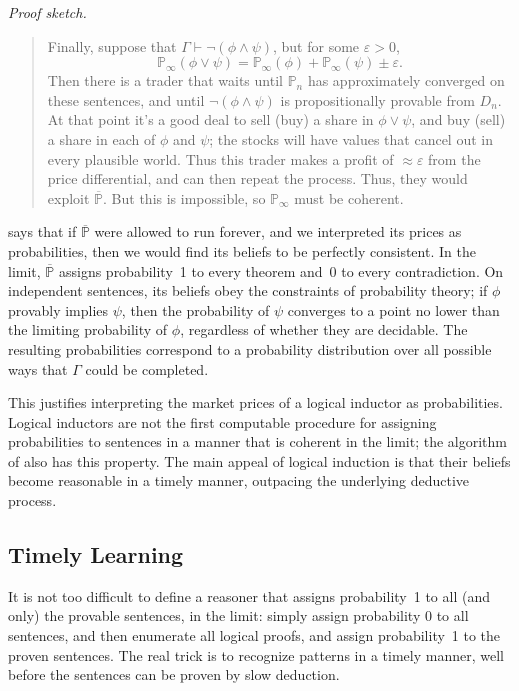 \documentclass[authordate,onecolumn,noenvironments]{miri-tech-article}
\numberwithin{equation}{subsection}
\newenvironment{sketch}[1][]{\noindent\emph{Proof sketch.}\proofin{#1}\begin{quote}}{\end{quote}}
\newcommand{\seq}[1]{{\overline{#1}}}
\newcommand{\nn}{n}
\newcommand{\li}{logical inductor}
\newcommand{\rparenthetical}[1]{\hfill\upshape{{\small (#1)}}} %
\newcommand{\proofin}[1]{\rparenthetical{Proof in:~#1.}}
\newcommand{\BelState}{\mathbb{P}}
\newcommand{\pt}{\BelState}
\newcommand{\MP}{\seq{\pt}}
\newcommand{\dt}{D}
\newcommand{\Theory}{\Gamma}
\begin{document}
\begin{sketch}[\ref{sec:limitcoherence} or~\ref{app:lc}]
  Finally, suppose that $\Theory \vdash \lnot(\phi \land \psi)$, but for some $\varepsilon > 0$,
  \[
    \pt_\infty(\phi \lor \psi) = \pt_\infty(\phi) + \pt_\infty(\psi) \pm \varepsilon.
  \] 
  Then there is a trader that waits until $\pt_n$ has approximately converged on these sentences, and until  $\lnot(\phi \land \psi)$ is propositionally provable from $\dt_\nn$. At that point it's a good deal to sell (buy) a share in $\phi \lor \psi$, and buy (sell) a share in each of $\phi$ and $\psi$; the stocks will have values that cancel out in every plausible world. Thus this trader makes a profit of $\approx \varepsilon$ from the price differential, and can then repeat the process. Thus, they would exploit $\MP$. But this is impossible, so $\pt_\infty$ must be coherent.
\end{sketch}

 says that if $\MP$ were allowed to run forever, and we interpreted its prices as probabilities, then we would find its beliefs to be perfectly consistent. In the limit, $\MP$ assigns probability~1 to every theorem and~0 to every contradiction. On independent sentences, its beliefs obey the constraints of probability theory; if $\phi$ provably implies $\psi$, then the probability of $\psi$ converges to a point no lower than the limiting probability of $\phi$, regardless of whether they are decidable. The resulting probabilities correspond to a probability distribution over all possible ways that $\Theory$ could be completed.

This justifies interpreting the market prices of a \li{} as probabilities. Logical inductors are not the first computable procedure for assigning probabilities to sentences in a manner that is coherent in the limit; the algorithm of \citet{Demski:2012a} also has this property. The main appeal of logical induction is that their beliefs become reasonable in a timely manner, outpacing the underlying deductive process.




\subsection{Timely Learning}\label{sec:timelylearning}

It is not too difficult to define a reasoner that assigns probability~1 to all (and only) the provable sentences, in the limit: simply assign probability 0 to all sentences, and then enumerate all logical proofs, and assign probability~1 to the proven sentences. The real trick is to recognize patterns in a timely manner, well before the sentences can be proven by slow deduction.
\end{document}

